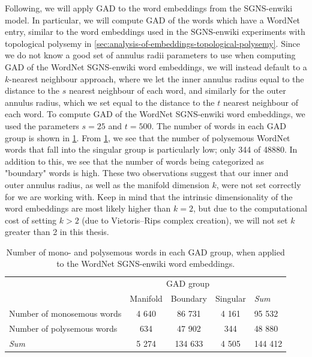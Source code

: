 Following, we will apply GAD to the word embeddings from the SGNS-enwiki model. In particular, we will compute GAD of the words which have a WordNet entry, similar to the word embeddings used in the SGNS-enwiki experiments with topological polysemy in \cref{sec:analysis-of-embeddings-topological-polysemy}. Since we do not know a good set of annulus radii parameters to use when computing GAD of the WordNet SGNS-enwiki word embeddings, we will instead default to a $k$-nearest neighbour approach, where we let the inner annulus radius equal to the distance to the $s$ nearest neighbour of each word, and similarly for the outer annulus radius, which we set equal to the distance to the $t$ nearest neighbour of each word. To compute GAD of the WordNet SGNS-enwiki word embeddings, we used the parameters $s=25$ and $t=500$. The number of words in each GAD group is shown in \cref{table:number-of-words-gad-polysemous-sgns-enwiki-wordnet}. From \cref{table:number-of-words-gad-polysemous-sgns-enwiki-wordnet}, we see that the number of polysemous WordNet words that fall into the singular group is particularly low; only 344 of 48880. In addition to this, we see that the number of words being categorized as "boundary" words is high. These two observations suggest that our inner and outer annulus radius, as well as the manifold dimension $k$, were not set correctly for we are working with. Keep in mind that the intrinsic dimensionality of the word embeddings are most likely higher than $k=2$, but due to the computational cost of setting $k > 2$ (due to Vietoris–Rips complex creation), we will not set $k$ greater than 2 in this thesis.
\begin{table}[H]
    \centering
    \begin{tabular}{@{}lcccl@{}}
    \toprule
    \multicolumn{1}{c}{}       & \multicolumn{3}{c}{GAD group}  & \multicolumn{1}{l}{} \\ \cmidrule(lr){2-4}
    \multicolumn{1}{c}{}       & Manifold & Boundary & Singular & \textit{Sum}                  \\ \midrule
    \trcolor Number of monosemous words            & 4 640     & 86 731    & 4 161     & 95 532                \\
    Number of polysemous words & 634      & 47 902    & 344      & 48 880                \\ \midrule
    \trcolor \textit{Sum}                        & 5 274     & 134 633   & 4 505     & 144 412 \\ \bottomrule
    \end{tabular}
    \caption{Number of mono- and polysemous words in each GAD group, when applied to the WordNet SGNS-enwiki word embeddings.}
    \label{table:number-of-words-gad-polysemous-sgns-enwiki-wordnet}
\end{table}


